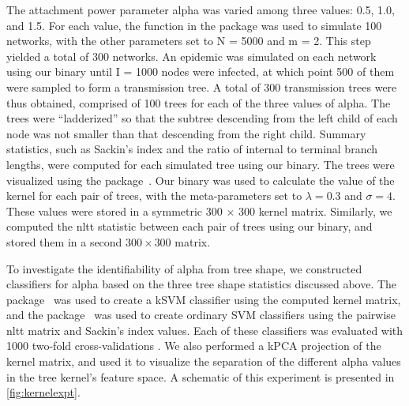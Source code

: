 The attachment power parameter \gls{alpha} was varied among three values: 0.5,
1.0, and 1.5. For each value, the  function in the
 package was used to simulate 100 networks, with the other
parameters set to \gls{N} = 5000 and \gls{m} = 2. This step yielded a total of
300 networks. An epidemic was simulated on each network using our
 binary until \gls{I} = 1000 nodes were infected, at which
point 500 of them were sampled to form a transmission tree. A total of 300
transmission trees were thus obtained, comprised of 100 trees for each of the
three values of \gls{alpha}. The trees were ``ladderized'' so that the subtree
descending from the left child of each node was not smaller than that
descending from the right child. Summary statistics, such as Sackin's index and
the ratio of internal to terminal branch lengths, were computed for each
simulated tree using our  binary. The trees were visualized
using the  package~\autocite{paradis2004ape}. 
Our  binary was used to calculate the value of the kernel
for each pair of trees, with the meta-parameters set to $\lambda = 0.3$ and
$\sigma = 4$. These values were stored in a symmetric 300 $\times$ 300 kernel
matrix.  Similarly, we computed the \gls{nltt} statistic between each pair of
trees using our  binary, and stored them in a second $300
\times 300$ matrix.

To investigate the identifiability of \gls{alpha} from tree shape, we
constructed classifiers for \gls{alpha} based on the three tree shape
statistics discussed above. The 
package~\autocite{zeileis2004kernlab} was used to create a \gls{kSVM}
classifier using the computed kernel matrix, and the 
package~\autocite{meyer2015e1071} was used to create ordinary \gls{SVM}
classifiers using the pairwise \gls{nltt} matrix and Sackin's index values.
 Each of these classifiers was evaluated with 1000 two-fold
cross-validations . We also performed a
\gls{kPCA} projection of the kernel matrix, and used it to visualize the
separation of the different \gls{alpha} values in the tree kernel's feature
space. A schematic of this experiment is presented in \cref{fig:kernelexpt}.

